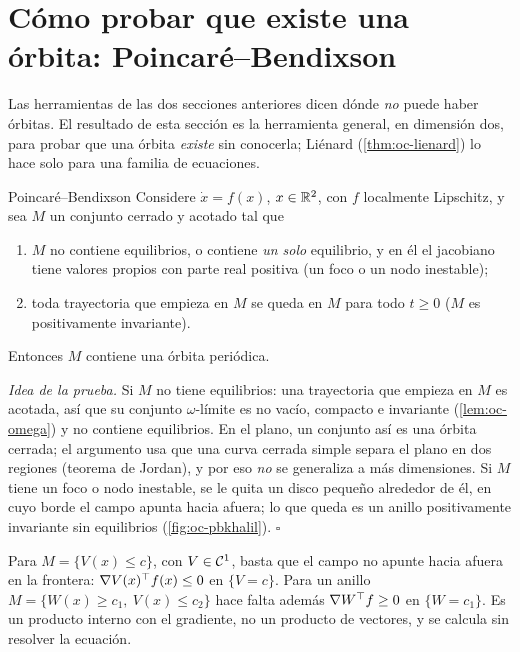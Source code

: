 \section{Cómo probar que existe una órbita: Poincaré--Bendixson}
\label{sec:oc-pb}

Las herramientas de las dos secciones anteriores dicen dónde \emph{no} puede haber órbitas. El resultado de esta sección es la herramienta general, en dimensión dos, para probar que una órbita \emph{existe} sin conocerla; Liénard (\cref{thm:oc-lienard}) lo hace solo para una familia de ecuaciones.

\begin{teorema}[label=thm:oc-pb]{Poincaré--Bendixson \citep[Lema~2.1]{Kha02}}
Considere $\dot x=f(x)$, $x\in\mathbb{R}^2$, con $f$ localmente Lipschitz, y sea $M$ un conjunto cerrado y acotado tal que
\begin{enumerate}
  \item $M$ no contiene equilibrios, o contiene \emph{un solo} equilibrio, y en él el jacobiano tiene valores propios con parte real positiva (un foco o un nodo inestable);
  \item toda trayectoria que empieza en $M$ se queda en $M$ para todo $t\ge0$ ($M$ es positivamente invariante).
\end{enumerate}
Entonces $M$ contiene una órbita periódica.
\end{teorema}

\noindent\emph{Idea de la prueba.} Si $M$ no tiene equilibrios: una trayectoria que empieza en $M$ es acotada, así que su conjunto $\omega$-límite es no vacío, compacto e invariante (\cref{lem:oc-omega}) y no contiene equilibrios. En el plano, un conjunto así es una órbita cerrada; el argumento usa que una curva cerrada simple separa el plano en dos regiones (teorema de Jordan), y por eso \emph{no} se generaliza a más dimensiones. Si $M$ tiene un foco o nodo inestable, se le quita un disco pequeño alrededor de él, en cuyo borde el campo apunta hacia afuera; lo que queda es un anillo positivamente invariante sin equilibrios (\cref{fig:oc-pbkhalil}). \hfill$\square$

\begin{cuidado}
Para $M=\{V(x)\le c\}$, con $V\in\mathcal{C}^{1}$, basta que el campo no apunte hacia afuera en la frontera: $\nabla V(x)^{\top} f(x)\le0$ en $\{V=c\}$. Para un anillo $M=\{W(x)\ge c_1,\ V(x)\le c_2\}$ hace falta además $\nabla W^{\top} f\ge0$ en $\{W=c_1\}$. Es un producto interno con el gradiente, no un producto de vectores, y se calcula sin resolver la ecuación.
\end{cuidado}

